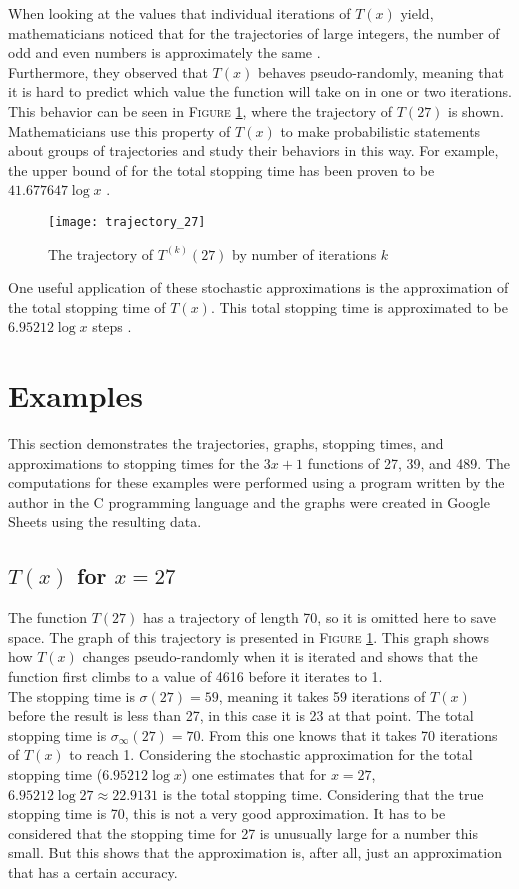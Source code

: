 \documentclass[12pt,a4paper,reqno]{amsart}
\begin{document}
When looking at the values that individual iterations of $T(x)$ yield,
mathematicians noticed that for the trajectories of large integers, the number
of odd and even numbers is approximately the same \cite{src:lagarias}. \\
Furthermore, they observed that $T(x)$ behaves pseudo-randomly, meaning that it 
is hard to predict which value the function will take on in one or two 
iterations. This behavior can be seen in \textsc{Figure} \ref{fig:01}, where 
the trajectory of $T(27)$ is shown. \\
Mathematicians use this property of $T(x)$ to make probabilistic statements 
about groups of trajectories and study their  behaviors in this way. For 
example, the upper bound of for the total stopping time has been proven to be 
$41.677647 \log x$ \cite{src:lagarias}.
\begin{figure}[h]
\texttt{[image: trajectory\_27]}
    \caption{The trajectory of $T^{(k)}(27)$ by number of iterations $k$}
\label{fig:01}
\end{figure}
One useful application of these stochastic approximations is the approximation
of the total stopping time of $T(x)$. This total stopping time is approximated 
to be $6.95212 \log x$ steps \cite{src:lagarias}.

\section{Examples}

This section demonstrates the trajectories, graphs, stopping times, and 
approximations to stopping times for the $3x+1$ functions of 27, 39, and 489. 
The computations for these examples were performed using a program written by 
the author in the C programming language and the graphs were created in Google 
Sheets using the resulting data.

\subsection{$T(x)$ for $x=27$}

The function $T(27)$ has a trajectory of length 70, so it is omitted here to 
save space. The graph of this trajectory is presented in \textsc{Figure} 
\ref{fig:01}. This graph shows how $T(x)$ changes pseudo-randomly when it is
iterated and shows that the function first climbs to a value of 4616 before it 
iterates to 1. \\
The stopping time is $\sigma(27)=59$, meaning it takes 59 iterations of $T(x)$
before the result is less than 27, in this case it is 23 at that point. The 
total stopping time is $\sigma_{\infty}(27)=70$. From this one knows that it 
takes 70 iterations of $T(x)$ to reach 1. Considering the stochastic 
approximation for the total stopping time ($6.95212 \log x$) one estimates that 
for $x=27$, $6.95212 \log 27 \approx 22.9131$ is the total stopping time. 
Considering that the true stopping time is 70, this is not a very good 
approximation. It has to be considered that the stopping time for 27 is 
unusually large for a number this small. But this shows that the approximation 
is, after all, just an approximation that has a certain accuracy.
\end{document}
